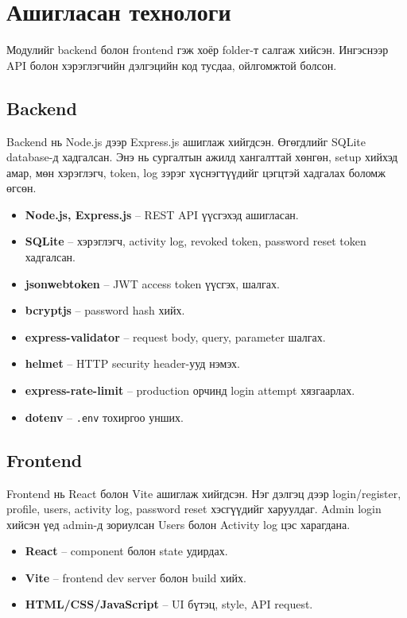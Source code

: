 \documentclass[12pt,a4paper]{article}
\begin{document}
\section{Ашигласан технологи}

Модулийг backend болон frontend гэж хоёр folder-т салгаж хийсэн. Ингэснээр API болон хэрэглэгчийн дэлгэцийн код тусдаа, ойлгомжтой болсон.

\subsection{Backend}

Backend нь Node.js дээр Express.js ашиглаж хийгдсэн. Өгөгдлийг SQLite database-д хадгалсан. Энэ нь сургалтын ажилд хангалттай хөнгөн, setup хийхэд амар, мөн хэрэглэгч, token, log зэрэг хүснэгтүүдийг цэгцтэй хадгалах боломж өгсөн.

\begin{itemize}
  \item \textbf{Node.js, Express.js} -- REST API үүсгэхэд ашигласан.
  \item \textbf{SQLite} -- хэрэглэгч, activity log, revoked token, password reset token хадгалсан.
  \item \textbf{jsonwebtoken} -- JWT access token үүсгэх, шалгах.
  \item \textbf{bcryptjs} -- password hash хийх.
  \item \textbf{express-validator} -- request body, query, parameter шалгах.
  \item \textbf{helmet} -- HTTP security header-ууд нэмэх.
  \item \textbf{express-rate-limit} -- production орчинд login attempt хязгаарлах.
  \item \textbf{dotenv} -- \texttt{.env} тохиргоо унших.
\end{itemize}

\subsection{Frontend}

Frontend нь React болон Vite ашиглаж хийгдсэн. Нэг дэлгэц дээр login/register, profile, users, activity log, password reset хэсгүүдийг харуулдаг. Admin login хийсэн үед admin-д зориулсан Users болон Activity log цэс харагдана.

\begin{itemize}
  \item \textbf{React} -- component болон state удирдах.
  \item \textbf{Vite} -- frontend dev server болон build хийх.
  \item \textbf{HTML/CSS/JavaScript} -- UI бүтэц, style, API request.
\end{itemize}
\end{document}
